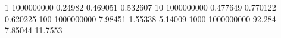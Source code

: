 1 1000000000 0.24982 0.469051 0.532607
10 1000000000 0.477649 0.770122 0.620225
100 1000000000 7.98451 1.55338 5.14009
1000 1000000000 92.284 7.85044 11.7553
